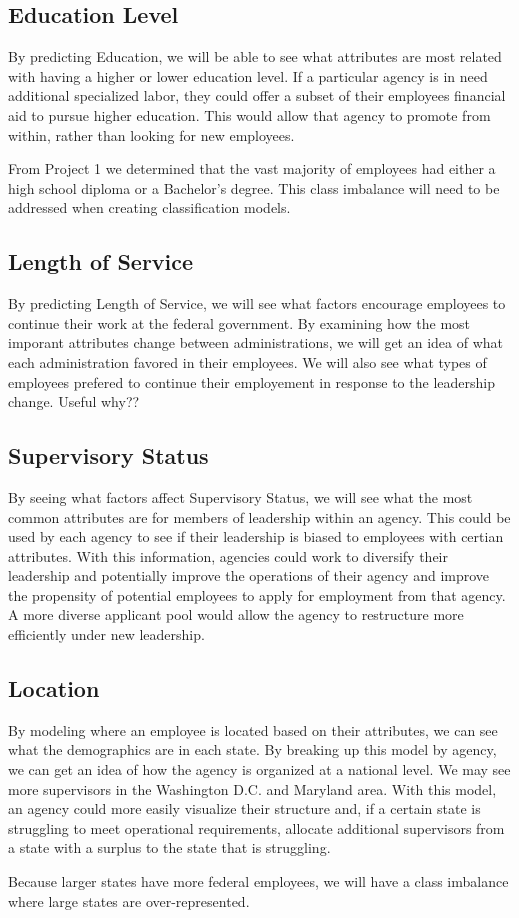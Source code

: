 \documentclass{article}
\begin{document}
    \subsection{Education Level}
    By predicting Education, we will be able to see what attributes are most related with having a higher or lower education level. If a particular agency is in need additional specialized labor, they could offer a subset of their employees financial aid to pursue higher education. This would allow that agency to promote from within, rather than looking for new employees.
    \par
    From Project 1 we determined that the vast majority of employees had either a high school diploma or a Bachelor's degree. This class imbalance will need to be addressed when creating classification models.\cite{proj1}

    \subsection{Length of Service}
    By predicting Length of Service, we will see what factors encourage employees to continue their work at the federal government. By examining how the most imporant attributes change between administrations, we will get an idea of what each administration favored in their employees. We will also see what types of employees prefered to continue their employement in response to the leadership change. Useful why??

    \subsection{Supervisory Status}
    By seeing what factors affect Supervisory Status, we will see what the most common attributes are for members of leadership within an agency. This could be used by each agency to see if their leadership is biased to employees with certian attributes. With this information, agencies could work to diversify their leadership and potentially improve the operations of their agency and improve the propensity of potential employees to apply for employment from that agency. A more diverse applicant pool would allow the agency to restructure more efficiently under new leadership.

    \subsection{Location}
    By modeling where an employee is located based on their attributes, we can see what the demographics are in each state. By breaking up this model by agency, we can get an idea of how the agency is organized at a national level. We may see more supervisors in the Washington D.C. and Maryland area. With this model, an agency could more easily visualize their structure and, if a certain state is struggling to meet operational requirements, allocate additional supervisors from a state with a surplus to the state that is struggling.
    \par
    Because larger states have more federal employees, we will have a class imbalance where large states are over-represented.
\end{document}
